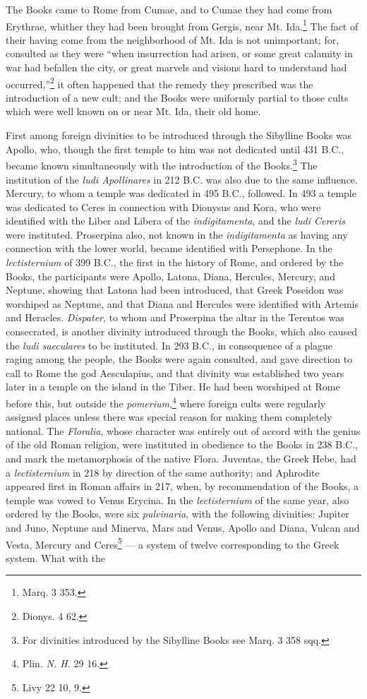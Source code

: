 \documentclass[a4paper, 11pt, oneside, polutonikogreek, english]{article}
\begin{document}
The Books came to Rome from Cumae, and to Cumae they had come from Erythrae, whither they had been brought from Gergis, near Mt. Ida.\footnote{Marq. 3 353.} The fact of their having come from the neighborhood of Mt. Ida is not unimportant; for, consulted as they were ``when insurrection had arisen, or some great calamity in war had befallen the city, or great marvels and visions hard to understand had occurred,''\footnote{Dionys. 4 62.} it often happened that the remedy they prescribed was the introduction of a new cult; and the Books were uniformly partial to those cults which were well known on or near Mt. Ida, their old home.

First among foreign divinities to be introduced through the Sibylline Books was Apollo, who, though the first temple to him was not dedicated until 431 \textsc{B.C.}, became known simultaneously with the introduction of the Books.\footnote{For divinities introduced by the Sibylline Books see Marq. 3 358 sqq.} The institution of the \emph{ludi Apollinares} in 212 \textsc{B.C.} was also due to the same influence. Mercury, to whom a temple was dedicated in 495 \textsc{B.C.}, followed. In 493 a temple was dedicated to Ceres in connection with Dionysus and Kora, who were identified with the Liber and Libera of the \emph{indigitamenta}, and the \emph{ludi Cereris} were instituted. Proserpina also, not known in the \emph{indigitamenta} as having any connection with the lower world, became identified with Persephone. In the \emph{lectisternium} of 399 \textsc{B.C.}, the first in the history of Rome, and ordered by the Books, the participants were Apollo, Latona, Diana, Hercules, Mercury, and Neptune, showing that Latona had been introduced, that Greek Poseidon was worshiped as Neptune, and that Diana and Hercules were identified with Artemis and Heracles. \emph{Dispater}, to whom and Proserpina the altar in the Terentos was consecrated, is another divinity introduced through the Books, which also caused the \emph{ludi saeculares} to be instituted. In 293 \textsc{B.C.}, in consequence of a plague raging among the people, the Books were again consulted, and gave direction to call to Rome the god Aesculapius, and that divinity was established two years later in a temple on the island in the Tiber. He had been worshiped at Rome before this, but outside the \emph{pomerium},\footnote{Plin. \emph{N. H.} 29 16.} where foreign cults were regularly assigned places unless there was special reason for making them completely national. The \emph{Floralia}, whose character was entirely out of accord with the genius of the old Roman religion, were instituted in obedience to the Books in 238 \textsc{B.C.}, and mark the metamorphosis of the native Flora. Juventas, the Greek Hebe, had a \emph{lectisternium} in 218 by direction of the same authority; and Aphrodite appeared first in Roman affairs in 217, when, by recommendation of the Books, a temple was vowed to Venus Erycina. In the \emph{lectisternium} of the same year, also ordered by the Books, were six \emph{pulvinaria}, with the following divinities: Jupiter and Juno, Neptune and Minerva, Mars and Venus, Apollo and Diana, Vulcan and Vesta, Mercury and Ceres\footnote{Livy 22 10, 9.} --- a system of twelve corresponding to the Greek system. What with the 
\end{document}
